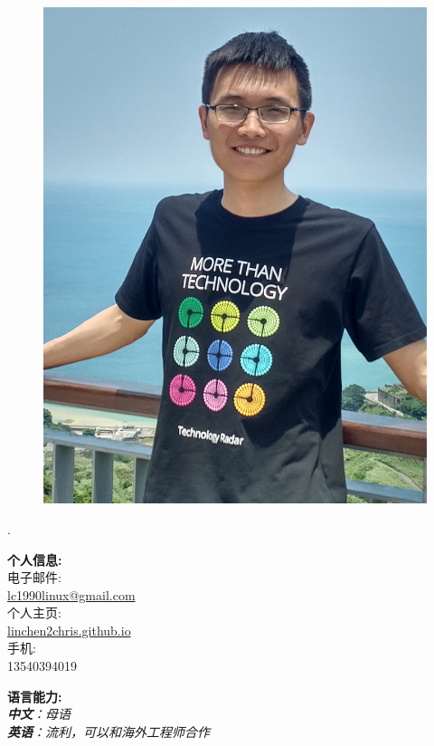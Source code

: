 \documentclass[a4paper,12pt,final]{memoir}
\newcommand{\myThemeColor}{RoyalBlue}
\newcommand{\SmallSep}{\vspace{0.9em}}
\newcommand{\CVItem}[1]
	{\textbf{\color{\myThemeColor} #1}}
\begin{document}
\begin{CJK*}{UTF8}{gbsn}%
\begin{figure}
	\hfill
	\includegraphics[width=0.7\columnwidth]{photo}
	\vspace{-7cm}
\end{figure}
\begin{flushright}\footnotesize
.\\
\vskip 6cm
    \raggedright
	\CVItem{{\large 个人信息:}}\\
	电子邮件:\\
	\href{mailto:lc1990linux@gmail.com}{lc1990linux@gmail.com}  \\
	个人主页:\\
	\href{http://linchen2chris.github.io/}{linchen2chris.github.io} \\
	手机:\\ 13540394019	
  
	\CVItem{{\large 语言能力:}}\\
  \SmallSep
	\textit{\textbf{中文}：母语 \\\textbf{英语}：流利，可以和海外工程师合作\\}
	
	
\end{flushright}\normalsize
\framebreak



\end{CJK*}
\end{document}
